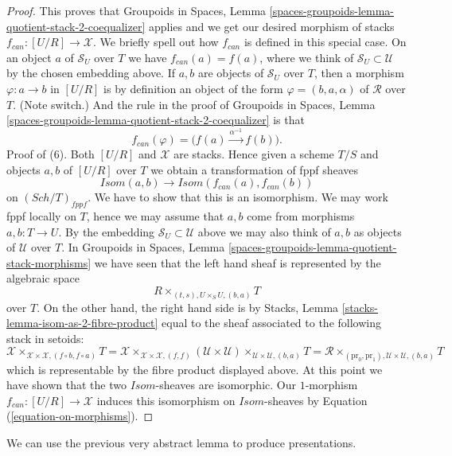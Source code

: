 \documentclass{stacks-project}
\theoremstyle{plain}
\theoremstyle{definition}
\theoremstyle{remark}
\numberwithin{equation}{subsection}
\def\Sch{\mathit{Sch}}
\begin{document}
\begin{proof}
\medskip\noindent
This proves that
Groupoids in Spaces,
Lemma \ref{spaces-groupoids-lemma-quotient-stack-2-coequalizer}
applies and we get our desired morphism of stacks
$f_{can} : [U/R] \to \mathcal{X}$. We briefly spell out how
$f_{can}$ is defined in this special case.
On an object $a$ of $\mathcal{S}_U$ over $T$
we have $f_{can}(a) = f(a)$, where we think of
$\mathcal{S}_U \subset \mathcal{U}$ by the chosen embedding above.
If $a, b$ are objects of $\mathcal{S}_U$ over $T$, then a morphism
$\varphi : a \to b$ in $[U/R]$ is by definition an object of the
form $\varphi = (b, a, \alpha)$ of $\mathcal{R}$ over $T$. (Note
switch.) And the rule in the proof of
Groupoids in Spaces,
Lemma \ref{spaces-groupoids-lemma-quotient-stack-2-coequalizer}
is that
\begin{equation}
\label{equation-on-morphisms}
f_{can}(\varphi) = \Big(f(a) \xrightarrow{\alpha^{-1}} f(b)\Big).
\end{equation}
Proof of (6). Both $[U/R]$ and $\mathcal{X}$ are stacks.
Hence given a scheme $T/S$ and objects $a, b$ of $[U/R]$
over $T$ we obtain a transformation of fppf sheaves
$$
\mathit{Isom}(a, b) \longrightarrow \mathit{Isom}(f_{can}(a), f_{can}(b))
$$
on $(\Sch/T)_{fppf}$. We have to show that this is an
isomorphism. We may work fppf locally on $T$, hence we may assume that
$a, b$ come from morphisms $a, b : T \to U$. By the embedding
$\mathcal{S}_U \subset \mathcal{U}$ above we may also think of $a, b$ as
objects of $\mathcal{U}$ over $T$. In
Groupoids in Spaces,
Lemma \ref{spaces-groupoids-lemma-quotient-stack-morphisms}
we have seen that the left hand sheaf is represented by the algebraic space
$$
R \times_{(t, s), U \times_S U, (b, a)} T
$$
over $T$. On the other hand, the right hand side is by
Stacks, Lemma \ref{stacks-lemma-isom-as-2-fibre-product}
equal to the sheaf associated to the following stack in setoids:
$$
\mathcal{X}
\times_{\mathcal{X} \times \mathcal{X}, (f \circ b, f \circ a)} T =
\mathcal{X}
\times_{\mathcal{X} \times \mathcal{X}, (f, f)}
(\mathcal{U} \times \mathcal{U})
\times_{\mathcal{U} \times \mathcal{U}, (b, a)} T =
\mathcal{R}
\times_{(\text{pr}_0, \text{pr}_1), \mathcal{U} \times \mathcal{U}, (b, a)} T
$$
which is representable by the fibre product displayed above.
At this point we have shown that the two $\mathit{Isom}$-sheaves
are isomorphic. Our $1$-morphism $f_{can} : [U/R] \to \mathcal{X}$ induces
this isomorphism on $\mathit{Isom}$-sheaves by
Equation (\ref{equation-on-morphisms}).
\end{proof}

\noindent
We can use the previous very abstract lemma to produce
presentations.
\end{document}
